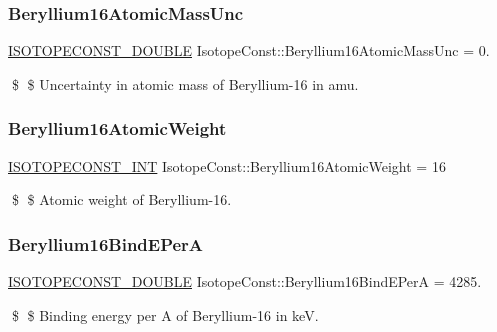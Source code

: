 \subsubsection{\texorpdfstring{Beryllium16\+Atomic\+Mass\+Unc}{Beryllium16AtomicMassUnc}}
{\footnotesize\ttfamily \mbox{\hyperlink{group___isotope_const-_macros_ga8f45a7272ce02c0b4c65c44636ed719a}{I\+S\+O\+T\+O\+P\+E\+C\+O\+N\+S\+T\+\_\+\+D\+O\+U\+B\+LE}} Isotope\+Const\+::\+Beryllium16\+Atomic\+Mass\+Unc = 0.}

\$ \$ Uncertainty in atomic mass of Beryllium-\/16 in amu. \mbox{\label{group___isotope_const-_beryllium-_be16_ga5fb9d717613b6d18b96bbb2c70bc51c5}} 
\subsubsection{\texorpdfstring{Beryllium16\+Atomic\+Weight}{Beryllium16AtomicWeight}}
{\footnotesize\ttfamily \mbox{\hyperlink{group___isotope_const-_macros_ga5f18360b3e99483a35c32d789e62621c}{I\+S\+O\+T\+O\+P\+E\+C\+O\+N\+S\+T\+\_\+\+I\+NT}} Isotope\+Const\+::\+Beryllium16\+Atomic\+Weight = 16}

\$ \$ Atomic weight of Beryllium-\/16. \mbox{\label{group___isotope_const-_beryllium-_be16_ga65d47a17d8a2dc97287daad769a3f2a8}} 
\subsubsection{\texorpdfstring{Beryllium16\+Bind\+E\+PerA}{Beryllium16BindEPerA}}
{\footnotesize\ttfamily \mbox{\hyperlink{group___isotope_const-_macros_ga8f45a7272ce02c0b4c65c44636ed719a}{I\+S\+O\+T\+O\+P\+E\+C\+O\+N\+S\+T\+\_\+\+D\+O\+U\+B\+LE}} Isotope\+Const\+::\+Beryllium16\+Bind\+E\+PerA = 4285.}

\$ \$ Binding energy per A of Beryllium-\/16 in keV. \mbox{\label{group___isotope_const-_beryllium-_be16_gac704487d5ccb77228f8fec2946b4e3d3}} 
